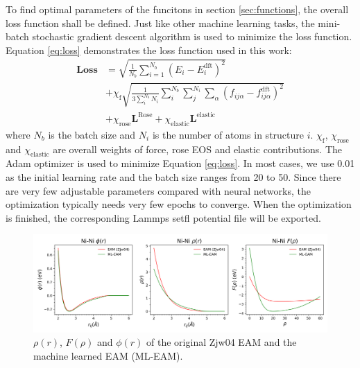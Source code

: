 \documentclass[prb,reprint,superscriptaddress]{revtex4-2}
\begin{document}
To find optimal parameters of the funcitons in section \ref{sec:functions}, the 
overall loss function shall be defined. Just like other machine learning tasks, 
the mini-batch stochastic gradient descent algorithm is used to minimize the 
loss function. Equation \ref{eq:loss} demonstrates the loss function used in 
this work:
\begin{align}
\label{eq:loss}
\mathbf{Loss} & = \sqrt{\frac{1}{N_{b}}\sum_{i=1}^{N_{b}}{\left(
    E_{i} - E_{i}^{\mathrm{dft}}
\right)^2}} \nonumber \\
& + \chi_{\mathrm{f}}\sqrt{
    \frac{1}{3\sum_{i}^{N_{b}}{N_i}}\sum_{i}^{N_b}{\sum_{j}^{N_i}{
        \sum_{\alpha}{
            \left(f_{ij\alpha} - f_{ij\alpha}^{\mathrm{dft}}\right)^2
        }
    }}
} \nonumber \\
& + \chi_{\mathrm{rose}}\mathbf{L}^{\mathrm{Rose}} 
+ \chi_{\mathrm{elastic}}\mathbf{L}^{\mathrm{elastic}}
\end{align} 
where $N_{b}$ is the batch size and $N_i$ is the number of atoms in structure 
$i$. $\chi_{\mathrm{f}}$, $\chi_{\mathrm{rose}}$ and $\chi_{\mathrm{elastic}}$ 
are overall weights of force, rose EOS and elastic contributions. 
The Adam optimizer \cite{adam} is used to minimize Equation \ref{eq:loss}. 
In most cases, we use 0.01 as the initial learning rate and the batch size 
ranges from 20 to 50. Since there are very few adjustable parameters compared 
with neural networks, the optimization typically needs very few epochs to 
converge. When the optimization is finished, the corresponding Lammps setfl 
potential file will be exported.

% 
%
\begin{figure}
\centering
\includegraphics[scale=0.57]{Ni_eam.png}
\caption{\label{fig:Ni_eam} $\rho(r)$, $F(\rho)$ and $\phi(r)$ of the original 
Zjw04 EAM and the machine learned EAM (ML-EAM).}
\end{figure}
\end{document}
